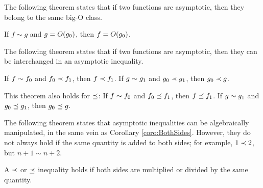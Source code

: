 The following theorem states that if two functions are asymptotic, then they belong to the same big-O class.

\begin{theorem}
\label{thm:SameBigOClass}
	If $f \sim g$ and $g = O(g_0)$, then $f = O(g_0)$.
\end{theorem}

The following theorem states that if two functions are asymptotic, then they can be interchanged in an asymptotic inequality.

\begin{theorem}
\label{thm:InterchangeableInInequality}
	If $f \sim f_0$ and $f_0 \prec f_1$, then $f \prec f_1$. If $g \sim g_1$ and $g_0 \prec g_1$, then $g_0 \prec g$.
\end{theorem}

\begin{corollary}
\label{coro:InterchangeableInNonStrictInequality}
	This theorem also holds for $\preceq$: If $f \sim f_0$ and $f_0 \preceq f_1$, then $f \preceq f_1$. If $g \sim g_1$ and $g_0 \preceq g_1$, then $g_0 \preceq g$.
\end{corollary}

The following theorem states that asymptotic inequalities can be algebraically manipulated, in the same vein as Corollary \ref{coro:BothSides}. However, they do not always hold if the same quantity is added to both sides; for example, $1 \prec 2$, but $n + 1 \sim n + 2$.

\begin{theorem}
\label{thm:BothSidesInequality}
	A $\prec$ or $\preceq$ inequality holds if both sides are multiplied or divided by the same quantity.
\end{theorem}